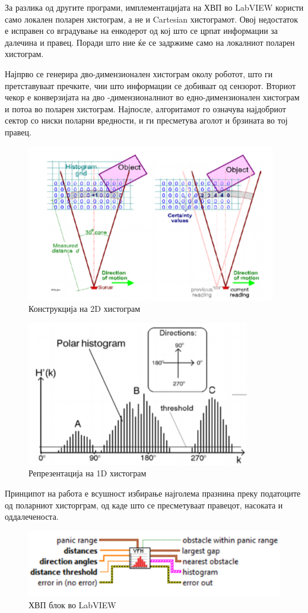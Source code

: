 \documentclass{article}
\begin{document}
За разлика од другите програми, имплементацијата на ХВП во LabVIEW користи само локален поларен хистограм, а не и Cartesian хистограмот. Овој недостаток е исправен со вградување на енкодерот од кој што се црпат информации за далечина и правец. Поради што ние ќе се задржиме само на локалниот поларен хистограм.

Најпрво се генерира дво-димензионален хистограм околу роботот, што ги претставуваат пречките, чии што информации се добиваат од сензорот. Вториот чекор е конверзијата на дво -димензионалниот во едно-димензионален хистограм и потоа во поларен хистограм. Најпосле, алгоритамот го означува најдобриот сектор со ниски поларни вредности, и ги пресметува аголот и брзината во тој правец.

\begin{figure}[H]
\centering
\includegraphics[width=0.35\linewidth]{./images/2d_his.png}
\caption{Конструкција на 2D хистограм}
\label{fig:2d_his.png}
\end{figure}

\begin{figure}[H]
\centering
\includegraphics[width=0.35\linewidth]{./images/1d_his.png}
\caption{Репрезентација на 1D хистограм}
\label{fig:1d_his.png}
\end{figure}

Принципот на работа е всушност избирање најголема празнина преку податоците од поларниот хисторграм, од каде што се пресметуваат правецот, насоката и оддалеченоста.

\begin{figure}[H]
\centering
\includegraphics[width=0.5\linewidth]{./images/vfh_lv.png}
\caption{ХВП блок во LabVIEW}
\label{fig:vfh_lv.png}
\end{figure}
\end{document}
